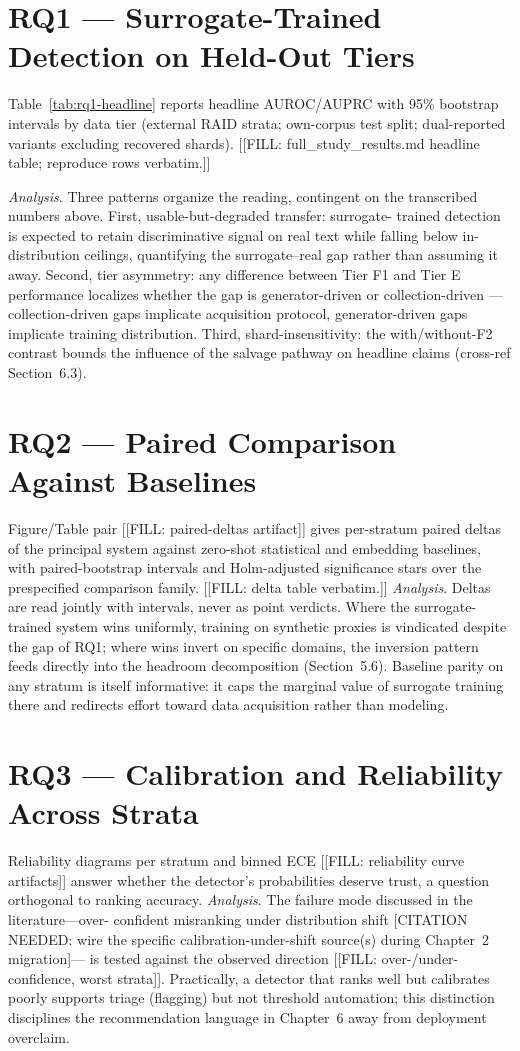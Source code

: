 \section{RQ1 --- Surrogate-Trained Detection on Held-Out Tiers}
Table~\ref{tab:rq1-headline} reports headline AUROC/AUPRC with 95\%
bootstrap intervals by data tier (external RAID strata; own-corpus test
split; dual-reported variants excluding recovered shards).
[[FILL: full\_study\_results.md headline table; reproduce rows verbatim.]]

\emph{Analysis}. Three patterns organize the reading, contingent on the
transcribed numbers above. First, usable-but-degraded transfer: surrogate-
trained detection is expected to retain discriminative signal on real text
while falling below in-distribution ceilings, quantifying the
surrogate--real gap rather than assuming it away. Second, tier asymmetry:
any difference between Tier F1 and Tier E performance localizes whether
the gap is generator-driven or collection-driven --- collection-driven
gaps implicate acquisition protocol, generator-driven gaps implicate
training distribution. Third, shard-insensitivity: the with/without-F2
contrast bounds the influence of the salvage pathway on headline claims
(cross-ref Section~6.3).

\section{RQ2 --- Paired Comparison Against Baselines}
Figure/Table pair [[FILL: paired-deltas artifact]] gives per-stratum
paired deltas of the principal system against zero-shot statistical and
embedding baselines, with paired-bootstrap intervals and Holm-adjusted
significance stars over the prespecified comparison family.
[[FILL: delta table verbatim.]]
\emph{Analysis}. Deltas are read jointly with intervals, never as point
verdicts. Where the surrogate-trained system wins uniformly, training on
synthetic proxies is vindicated despite the gap of RQ1; where wins invert
on specific domains, the inversion pattern feeds directly into the
headroom decomposition (Section~5.6). Baseline parity on any stratum is
itself informative: it caps the marginal value of surrogate training there
and redirects effort toward data acquisition rather than modeling.

\section{RQ3 --- Calibration and Reliability Across Strata}
Reliability diagrams per stratum and binned ECE [[FILL: reliability curve
artifacts]] answer whether the detector's probabilities deserve trust, a
question orthogonal to ranking accuracy.
\emph{Analysis}. The failure mode discussed in the literature---over-
confident misranking under distribution shift [CITATION NEEDED: wire the
specific calibration-under-shift source(s) during Chapter~2 migration]---
is tested against the observed direction [[FILL: over-/under-confidence,
worst strata]]. Practically, a detector that ranks well but calibrates
poorly supports triage (flagging) but not threshold automation; this
distinction disciplines the recommendation language in Chapter~6 away
from deployment overclaim.

